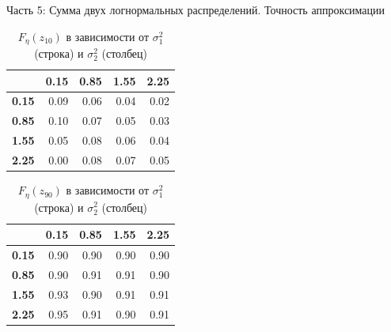 \documentclass[ucs, notheorems, handout]{beamer}
\begin{document}
\begin{frame}{Часть 5: Сумма двух логнормальных распределений. Точность аппроксимации}
	
	\begin{table}[!hhh]
		\centering
		\caption{$F_{\eta}(z_{10})$ в зависимости от $\sigma_{1}^{2}$ (строка) и $\sigma_{2}^{2}$ (столбец) }
		\label{tab5}
		\begin{tabular}{rrrrr}
			\hline
			& \textbf{0.15} & \textbf{0.85} & \textbf{1.55} & \textbf{2.25} \\
			\hline
			\textbf{0.15} & 0.09 & 0.06 & 0.04 & 0.02 \\ 
			\textbf{0.85} & 0.10 & 0.07 & 0.05 & 0.03 \\ 
			\textbf{1.55} & 0.05 & 0.08 & 0.06 & 0.04 \\ 
			\textbf{2.25} & 0.00 & 0.08 & 0.07 & 0.05 \\ 
			\hline
		\end{tabular}
	\end{table}
	
	\begin{table}[!hhh]
		\centering
		\caption{$F_{\eta}(z_{90})$ в зависимости от $\sigma_{1}^{2}$ (строка) и $\sigma_{2}^{2}$ (столбец)}
		\label{tab6}
		\begin{tabular}{rrrrr}
			\hline
			& \textbf{0.15} & \textbf{0.85} & \textbf{1.55} & \textbf{2.25} \\
			\hline
			\textbf{0.15} & 0.90 & 0.90 & 0.90 & 0.90 \\ 
			\textbf{0.85} & 0.90 & 0.91 & 0.91 & 0.90 \\ 
			\textbf{1.55} & 0.93 & 0.90 & 0.91 & 0.91 \\ 
			\textbf{2.25} & 0.95 & 0.91 & 0.90 & 0.91 \\ 
			\hline
		\end{tabular}
	\end{table}
\end{frame}
\end{document}

